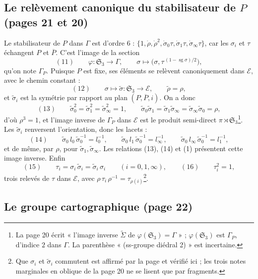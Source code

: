 \documentclass[11pt,a4paper]{article}
\begin{document}
\subsection*{Le relèvement canonique du stabilisateur de $P$ (pages 21 et 20)}

Le stabilisateur de $P$ dans $\Gamma$ est d'ordre $6$ : $\{1, \dot\rho,
\dot\rho^2, \dot\sigma_0\tau, \dot\sigma_1\tau, \dot\sigma_\infty\tau\}$, car
les $\sigma_i$ et $\tau$ échangent $P$ et $\overline{P}$. C'est l'image de la
section
\[
(11)\qquad \varphi : \mathfrak{S}_3 \longrightarrow \Gamma, \qquad \sigma
\longmapsto \bigl(\sigma, \tau^{\,(1-\operatorname{sg}\sigma)/2}\bigr),
\]
qu'on note $\Gamma_P$. Puisque $P$ est fixe, ses éléments se relèvent
canoniquement dans $\mathcal{E}$, avec le chemin constant :
\[
(12)\qquad \sigma \longmapsto \tilde\sigma : \mathfrak{S}_3 \longrightarrow
\mathcal{E}, \qquad \tilde\rho = \rho,
\]
et $\tilde\sigma_i$ est la symétrie par rapport au plan $(P, \overline{P},
i)$. On a donc
\[
(13)\qquad \tilde\sigma_0^2 = \tilde\sigma_1^2 = \tilde\sigma_\infty^2 = 1,
\qquad \tilde\sigma_0\tilde\sigma_1 = \tilde\sigma_1\tilde\sigma_\infty =
\tilde\sigma_\infty\tilde\sigma_0 = \rho,
\]
d'où $\rho^3 = 1$, et l'image inverse de $\Gamma_P$ dans $\mathcal{E}$ est le
produit semi-direct $\pi \rtimes \mathfrak{S}_3$\footnote{La page 20 écrit
« l'image inverse $\widetilde\Sigma$ de $\varphi(\mathfrak{S}_3) = \Gamma$ » ;
$\varphi(\mathfrak{S}_3)$ est $\Gamma_P$, d'indice $2$ dans $\Gamma$. La
parenthèse « (ss-groupe diédral 2) » est incertaine.}. Les $\tilde\sigma_i$
renversent l'orientation, donc les lacets :
\[
(14)\qquad \tilde\sigma_0\, l_0\, \tilde\sigma_0^{-1} = l_0^{-1}, \qquad
\tilde\sigma_0\, l_1\, \tilde\sigma_0^{-1} = l_\infty^{-1}, \qquad
\tilde\sigma_0\, l_\infty\, \tilde\sigma_0^{-1} = l_1^{-1},
\]
et de même, par $\rho$, pour $\tilde\sigma_1, \tilde\sigma_\infty$. Les
relations (13), (14) et (1) présentent cette image inverse. Enfin
\[
(15)\qquad \tau_i = \sigma_i\,\tilde\sigma_i = \tilde\sigma_i\,\sigma_i
\qquad (i = 0, 1, \infty), \qquad (16)\qquad \tau_i^2 = 1,
\]
trois relevés de $\tau$ dans $\mathcal{E}$, avec $\rho\,\tau_i\,\rho^{-1} =
\tau_{\rho(i)}$\footnote{Que $\sigma_i$ et $\tilde\sigma_i$ commutent est
affirmé par la page et vérifié ici ; les trois notes marginales en oblique de
la page 20 ne se lisent que par fragments.}.

\subsection*{Le groupe cartographique (page 22)}
\end{document}
